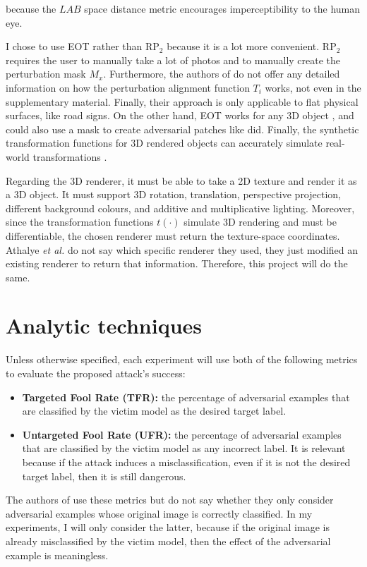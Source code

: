 \noindent because the $LAB$ space distance metric encourages imperceptibility to the human eye.

I chose to use EOT \cite{athalye} rather than $\textrm{RP}_2$ \cite{evtimov_road_signs} because it is a lot more convenient. $\textrm{RP}_2$ requires the user to manually take a lot of photos and to manually create the perturbation mask $M_x$. Furthermore, the authors of \cite{evtimov_road_signs} do not offer any detailed information on how the perturbation alignment function $T_i$ works, not even in the supplementary material. Finally, their approach is only applicable to flat physical surfaces, like road signs. On the other hand, EOT works for any 3D object \cite{athalye}, and could also use a mask to create adversarial patches like \cite{evtimov_road_signs} did. Finally, the synthetic transformation functions for 3D rendered objects can accurately simulate real-world transformations \cite{athalye}.

Regarding the 3D renderer, it must be able to take a 2D texture and render it as a 3D object. It must support 3D rotation, translation, perspective projection, different background colours, and additive and multiplicative lighting. Moreover, since the transformation functions $t(\cdot)$ simulate 3D rendering and must be differentiable, the chosen renderer must return the texture-space coordinates. Athalye \textit{et al.} \cite{athalye} do not say which specific renderer they used, they just modified an existing renderer to return that information. Therefore, this project will do the same.

\section{Analytic techniques}
    \label{sec:analytic_techniques}
    
Unless otherwise specified, each experiment will use both of the following metrics to evaluate the proposed attack's success:

\begin{itemize}
    \item \textbf{Targeted Fool Rate (TFR):} the percentage of adversarial examples that are classified by the victim model as the desired target label.
    \item \textbf{Untargeted Fool Rate (UFR):} the percentage of adversarial examples that are classified by the victim model as any incorrect label. It is relevant because if the attack induces a misclassification, even if it is not the desired target label, then it is still dangerous.
\end{itemize}

The authors of \cite{zheng_black_box_GAN} use these metrics but do not say whether they only consider adversarial examples whose original image is correctly classified. In my experiments, I will only consider the latter, because if the original image is already misclassified by the victim model, then the effect of the adversarial example is meaningless.
